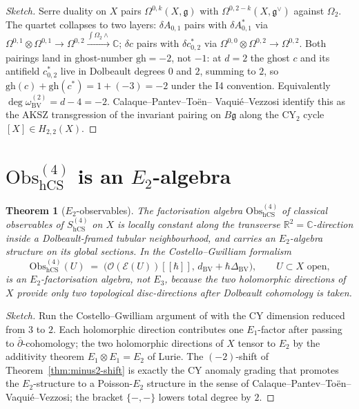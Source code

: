\documentclass[11pt]{amsart}
\providecommand{\C}{\mathbb{C}}
\providecommand{\R}{\mathbb{R}}
\providecommand{\cE}{\mathcal{E}}
\providecommand{\cO}{\mathcal{O}}
\providecommand{\Obs}{\mathrm{Obs}}
\providecommand{\dbar}{\bar{\partial}}
\providecommand{\g}{\mathfrak{g}}
\providecommand{\gh}{\mathrm{gh}}
\providecommand{\BV}{\mathrm{BV}}
\providecommand{\hCS}{\mathrm{hCS}}
\theoremstyle{plain}
\newtheorem{theorem}{Theorem}[section]
\theoremstyle{definition}
\begin{document}
\begin{proof}[Sketch]
Serre duality on $X$ pairs $\Omega^{0,k}(X,\g)$ with
$\Omega^{0,2-k}(X,\g^\vee)$ against $\Omega_2$. The quartet collapses
to two layers: $\delta A_{0,1}$ pairs with $\delta A^*_{0,1}$ via
$\Omega^{0,1}\otimes\Omega^{0,1}\to\Omega^{0,2}
\xrightarrow{\int\Omega_2\wedge} \C$; $\delta c$ pairs with
$\delta c^*_{0,2}$ via $\Omega^{0,0}\otimes\Omega^{0,2}\to
\Omega^{0,2}$. Both pairings land in ghost-number $\gh = -2$, not
$-1$: at $d=2$ the ghost $c$ and its antifield $c^*_{0,2}$ live in
Dolbeault degrees $0$ and $2$, summing to $2$, so $\gh(c) + \gh(c^*)
= 1 + (-3) = -2$ under the I4 convention. Equivalently
$\deg \omega_\BV^{(2)} = d - 4 = -2$. Calaque--Pantev--To\"en--
Vaqui\'e--Vezzosi \cite{CPTVV2017} identify this as the
AKSZ transgression of the invariant pairing on $B\g$ along
the CY$_2$ cycle $[X]\in H_{2,2}(X)$.
\end{proof}

\section{$\Obs_{\hCS}^{(4)}$ is an $E_2$-algebra}

\begin{theorem}[$E_2$-observables]
\label{thm:E2-obs}
The factorisation algebra $\Obs_{\hCS}^{(4)}$ of classical observables
of $S_\hCS^{(4)}$ on $X$ is locally constant along the transverse
$\R^2 = \C$-direction inside a Dolbeault-framed tubular neighbourhood,
and carries an $E_2$-algebra structure on its global sections. In the
Costello--Gwilliam formalism \cite{CG2021}
\[
\Obs_{\hCS}^{(4)}(U) \;=\; \bigl(\cO(\cE(U))[[\hbar]],\,
 d_\BV + \hbar \Delta_\BV\bigr),
\qquad U \subset X \text{ open,}
\]
is an $E_2$-factorisation algebra, not $E_3$, because the two
holomorphic directions of $X$ provide only two topological
disc-directions after Dolbeault cohomology is taken.
\end{theorem}

\begin{proof}[Sketch]
Run the Costello--Gwilliam argument of \cite[\S4.8]{CG2021} with
the CY dimension reduced from $3$ to $2$. Each holomorphic direction
contributes one $E_1$-factor after passing to $\dbar$-cohomology; the
two holomorphic directions of $X$ tensor to $E_2$ by the additivity
theorem $E_1 \otimes E_1 = E_2$ of Lurie. The $(-2)$-shift of
Theorem~\ref{thm:minus2-shift} is exactly the CY anomaly grading
that promotes the $E_2$-structure to a Poisson-$E_2$ structure in
the sense of Calaque--Pantev--To\"en--Vaqui\'e--Vezzosi; the bracket
$\{-,-\}$ lowers total degree by $2$.
\end{proof}
\end{document}
